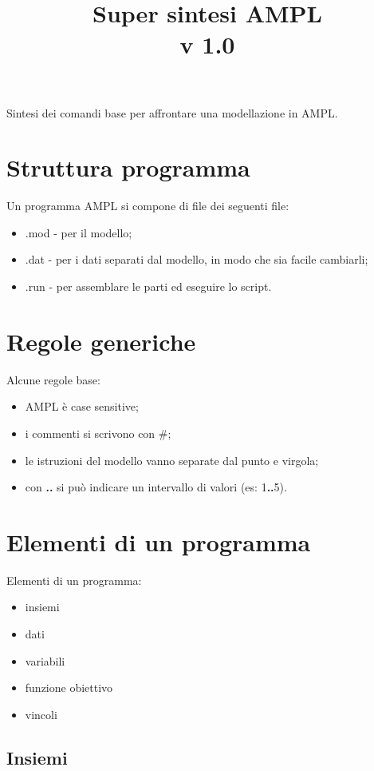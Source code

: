 

\title{Super sintesi AMPL \\ v 1.0}
\date{}



\maketitle
Sintesi dei comandi base per affrontare una modellazione in AMPL. 

\section{Struttura programma}
Un programma AMPL si compone di file dei seguenti file:
\begin{itemize}
\item .mod - per il modello;
\item .dat - per i dati separati dal modello, in modo che sia facile cambiarli;
\item .run - per assemblare le parti ed eseguire lo script.
\end{itemize}

\section{Regole generiche}
Alcune regole base:
\begin{itemize}
\item AMPL è case sensitive;
\item i commenti si scrivono con \#;
\item le istruzioni del modello vanno separate dal punto e virgola;
\item con \textbf{..} si può indicare un intervallo di valori (es: 1\textbf{..}5).
\end{itemize}

\section{Elementi di un programma}
Elementi di un programma:
\begin{itemize}
\item insiemi
\item dati
\item variabili
\item funzione obiettivo
\item vincoli
\end{itemize}

\subsection{Insiemi}

